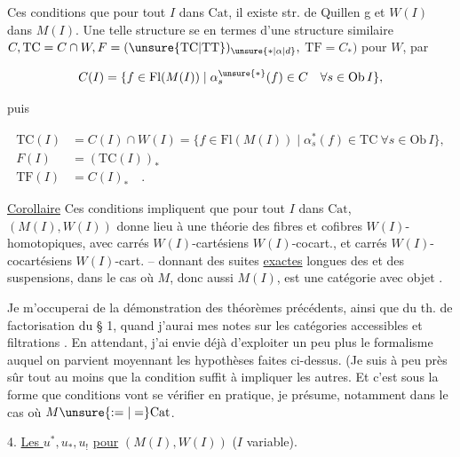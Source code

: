 
Ces conditions  que pour tout $I$ dans \uline{$\mathrm{Cat}$}, il existe  str. de Quillen    g et   $W(I)$ dans $M(I)$.  Une telle structure se  en termes d'une structure similaire $C,\mathrm{TC}=C\cap W,F=(\unsure{\mathrm{TC}|\mathrm{TT}})_{\unsure{*|\alpha|d}},$ $\mathrm{TF}=C_*)$ pour $W$, par

\[ C(I)=\{f\in\mathrm{Fl}(M(I))\mid\alpha_s^{\unsure{*}}(f)\in C\quad\forall s\in\mathrm{Ob}\,I\}, \]

puis

\[ \begin{aligned}
\mathrm{TC}(I)&=C(I)\cap W(I)=\{f\in\mathrm{Fl}(M(I))\mid\alpha_s^*(f)\in\mathrm{TC}\ \forall s\in\mathrm{Ob}\,I\},\\
F(I)&=(\mathrm{TC}(I))_*\\
\mathrm{TF}(I)&=C(I)_*\quad .
\end{aligned} \]

\uline{Corollaire} Ces conditions impliquent que pour tout  $I$ dans $\mathrm{Cat}$, $(M(I),W(I))$ donne lieu à une  théorie des fibres et cofibres $W(I)$-homotopiques, avec carrés $W(I)$-cartésiens  $W(I)$-cocart., et carrés $W(I)$-cocartésiens $W(I)$-cart. -- donnant des suites \uline{exactes} longues des  et des suspensions, dans le cas où $M$, donc aussi $M(I)$, est une catégorie avec objet .

Je m'occuperai de la démonstration des théorèmes précédents, ainsi que du th. de factorisation du § 1, quand j'aurai mes notes sur les catégories  accessibles et filtrations . En attendant, j'ai envie déjà d'exploiter un peu plus le formalisme auquel on parvient moyennant les hypothèses faites ci-dessus. (Je suis à peu près sûr tout au moins que la condition  suffit à impliquer  les autres. Et c'est  sous la forme  que  conditions vont se vérifier en pratique, je présume, notamment dans le cas où $M\unsure{:=|=}\mathrm{Cat}$.

4. \uline{Les } $u^*,u_*,u_!$ \uline{pour} $(M(I),W(I))$ ($I$ variable).

